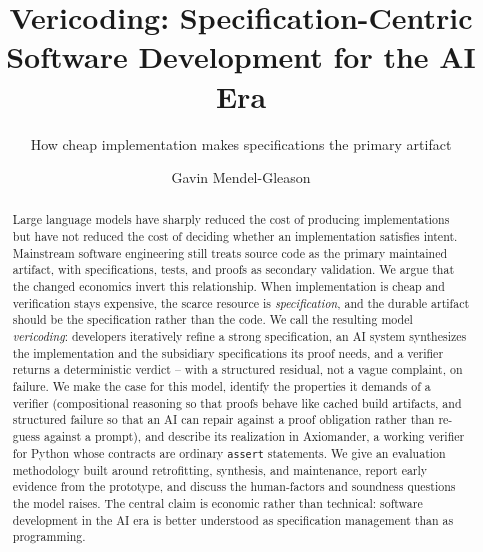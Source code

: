 \documentclass[sigconf,nonacm]{acmart}
\newcommand{\code}[1]{\texttt{#1}}
\begin{document}
\title{Vericoding: Specification-Centric Software Development for the AI Era}
\subtitle{How cheap implementation makes specifications the primary artifact}

\author{Gavin Mendel-Gleason}
\email{}

\renewcommand{\shortauthors}{Mendel-Gleason}

\begin{abstract}
Large language models have sharply reduced the cost of producing implementations
but have not reduced the cost of deciding whether an implementation satisfies
intent. Mainstream software engineering still treats source code as the primary
maintained artifact, with specifications, tests, and proofs as secondary
validation. We argue that the changed economics invert this relationship. When
implementation is cheap and verification stays expensive, the scarce resource is
\emph{specification}, and the durable artifact should be the specification rather
than the code. We call the resulting model \emph{vericoding}: developers
iteratively refine a strong specification, an AI system synthesizes the
implementation and the subsidiary specifications its proof needs, and a verifier
returns a deterministic verdict -- with a structured residual, not a vague
complaint, on failure. We make the case for this model, identify the properties
it demands of a verifier (compositional reasoning so that proofs behave like
cached build artifacts, and structured failure so that an AI can repair against a
proof obligation rather than re-guess against a prompt), and describe its
realization in Axiomander, a working verifier for Python whose contracts are
ordinary \code{assert} statements. We give an evaluation methodology built around
retrofitting, synthesis, and maintenance, report early evidence from the
prototype, and discuss the human-factors and soundness questions the model
raises. The central claim is economic rather than technical: software development
in the AI era is better understood as specification management than as
programming.
\end{abstract}


\maketitle
\end{document}
